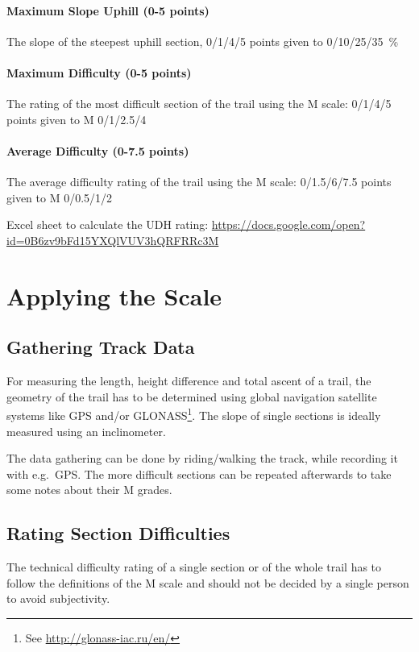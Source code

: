 \documentclass[a4paper,oneside]{scrartcl}
\begin{document}
\paragraph{Maximum Slope Uphill (0-5 points)} 
\hangindent=1cm
The slope of the steepest uphill section, 0/1/4/5 points given to 0/10/25/35~\%

\paragraph{Maximum Difficulty (0-5 points)}
\hangindent=1cm
The rating of the most difficult section of the trail using the M scale: 0/1/4/5
points given to M 0/1/2.5/4

\paragraph{Average Difficulty (0-7.5 points)} 
\hangindent=1cm
The average difficulty rating of the trail using the M scale: 0/1.5/6/7.5 points
given to M 0/0.5/1/2

\bigskip

Excel sheet to calculate the UDH rating: \url{https://docs.google.com/open?id=0B6zv9bFd15YXQlVUV3hQRFRRc3M}


\section{Applying the Scale}

\subsection{Gathering Track Data}
For measuring the length, height difference and total ascent of a trail, the
geometry of the trail has to be determined using global navigation satellite
systems like GPS and/or GLONASS\footnote{See \url{http://glonass-iac.ru/en/}}.
The slope of single sections is ideally measured using an inclinometer.

The data gathering can be done by riding/walking the track, while recording it
with e.g.\ GPS. The more difficult sections can be repeated afterwards to take
some notes about their M grades.

\subsection{Rating Section Difficulties}
The technical difficulty rating of a single section or of the whole trail has to
follow the definitions of the M scale and should not be decided by a single
person to avoid subjectivity.
\end{document}
